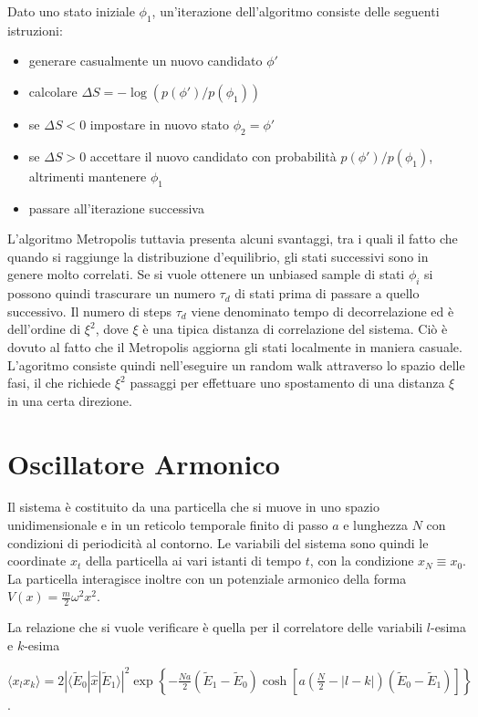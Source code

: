 Dato uno stato iniziale $\phi_1$, un'iterazione dell'algoritmo consiste delle seguenti istruzioni:
\begin{itemize}
    \item generare casualmente un nuovo candidato $\phi'$
    \item calcolare $\Delta S = -\log(p(\phi')/p(\phi_1))$
    \item se $\Delta S < 0$ impostare in nuovo stato $\phi_2=\phi'$
    \item se $\Delta S > 0$ accettare il nuovo candidato con probabilità $p(\phi')/p(\phi_1)$, altrimenti mantenere $\phi_1$
    \item passare all'iterazione successiva
\end{itemize}
L'algoritmo Metropolis tuttavia presenta alcuni svantaggi, tra i quali il fatto che quando si raggiunge la distribuzione d'equilibrio, gli stati successivi sono in genere molto correlati. Se si vuole ottenere un unbiased sample di stati $\phi_i$ si possono quindi trascurare un numero $\tau_d$ di stati prima di passare a quello successivo. Il numero di steps $\tau_d$ viene denominato tempo di decorrelazione ed è dell'ordine di $\xi^2$, dove $\xi$ è una tipica distanza di correlazione del sistema. Ciò è dovuto al fatto che il Metropolis aggiorna gli stati localmente in maniera casuale. L'agoritmo consiste quindi nell'eseguire un random walk attraverso lo spazio delle fasi, il che richiede $\xi^2$ passaggi per effettuare uno spostamento di una distanza $\xi$ in una certa direzione.

\section{Oscillatore Armonico}
Il sistema è costituito da una particella che si muove in uno spazio unidimensionale e in un reticolo temporale finito di passo $a$ e lunghezza $N$ con condizioni di periodicità al contorno. Le variabili del sistema sono quindi le coordinate $x_t$ della particella ai vari istanti di tempo $t$, con la condizione $x_N \equiv x_0$. La particella interagisce inoltre con un potenziale armonico della forma $V(x) = \frac{m}{2}\omega^2 x^2$.

La relazione che si vuole verificare è quella per il correlatore delle variabili $l$-esima e $k$-esima
\begin{center}
\small
$\langle x_l x_k\rangle = 2|\langle\tilde{E}_0|\hat{x}|\tilde{E}_1\rangle|^2\exp\left\{-\frac{Na}{2}(\tilde{E}_1-\tilde{E}_0)\cosh\left[a\left(\frac{N}{2}-|l-k|\right)(\tilde{E}_0-\tilde{E}_1)\right]\right\}$.
\end{center}

